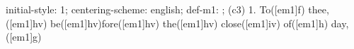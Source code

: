 initial-style: 1;
centering-scheme: english;
def-m1: \grealign;
(c3) 1. To([em1]f) thee,([em1]hv) be([em1]hv)fore([em1]hv) the([em1]hv) close([em1]iv) of([em1]h) day,([em1]g)